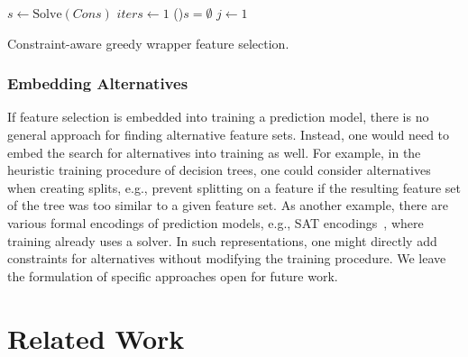 \documentclass{article}
\theoremstyle{definition}
\begin{document}
\begin{algorithm}[htb]
	\DontPrintSemicolon
	\BlankLine
	$s \leftarrow \text{Solve}(Cons)$ 
	$iters \leftarrow 1$ 
	\If(){$s = \emptyset$}{
		\Return{$\emptyset$}
	}
	$j \leftarrow 1$ 
	\caption{Constraint-aware greedy wrapper feature selection.}
	\label{al:afs:greedy-wrapper}
\end{algorithm}

\subsubsection{Embedding Alternatives}
\label{sec:afs:approach:objectives:embedding}

If feature selection is embedded into training a prediction model, there is no general approach for finding alternative feature sets.
Instead, one would need to embed the search for alternatives into training as well.
For example, in the heuristic training procedure of decision trees, one could consider alternatives when creating splits, e.g., prevent splitting on a feature if the resulting feature set of the tree was too similar to a given feature set.
As another example, there are various formal encodings of prediction models, e.g., SAT encodings~\cite{narodytska2018learning, schidler2021sat, yu2021learning}, where training already uses a solver.
In such representations, one might directly add constraints for alternatives without modifying the training procedure.
We leave the formulation of specific approaches open for future work.

\section{Related Work}
\label{sec:afs:related-work}
\end{document}
